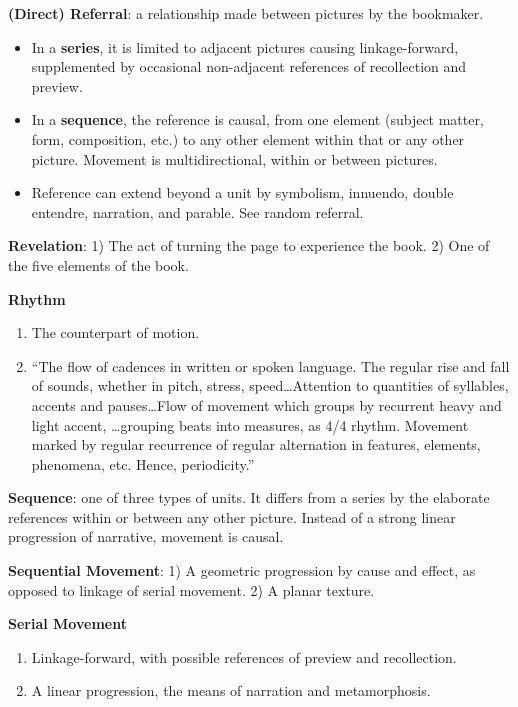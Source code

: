 \documentclass[12pt]{extarticle}
\begin{document}
\textbf{(Direct) Referral}: a relationship made between pictures by the bookmaker.
\begin{itemize}
  \item In a \textbf{series}, it is limited to adjacent pictures causing linkage-forward, supplemented by occasional non-adjacent references of recollection and preview.
  \item In a \textbf{sequence}, the reference is causal, from one element (subject matter, form, composition, etc.) to any other element within that or any other picture. Movement is multidirectional, within or between pictures.
  \item Reference can extend beyond a unit by symbolism, innuendo, double entendre, narration, and parable. See random referral.
\end{itemize}

\textbf{Revelation}: 1) The act of turning the page to experience the book. 2) One of the five elements of the book.

\textbf{Rhythm}
\begin{enumerate}
  \item The counterpart of motion.
  \item ``The flow of cadences in written or spoken language. The regular rise and fall of sounds, whether in pitch, stress, speed\ldots Attention to quantities of syllables, accents and pauses\ldots Flow of movement which groups by recurrent heavy and light accent, \ldots grouping beats into measures, as 4/4 rhythm. Movement marked by regular recurrence of regular alternation in features, elements, phenomena, etc. Hence, periodicity.''
\end{enumerate}

\textbf{Sequence}: one of three types of units. It differs from a series by the elaborate references within or between any other picture. Instead of a strong linear progression of narrative, movement is causal.

\textbf{Sequential Movement}: 1) A geometric progression by cause and effect, as opposed to linkage of serial movement. 2) A planar texture.

\textbf{Serial Movement}
\begin{enumerate}
  \item Linkage-forward, with possible references of preview and recollection.
  \item A linear progression, the means of narration and metamorphosis.
\end{enumerate}
\end{document}
